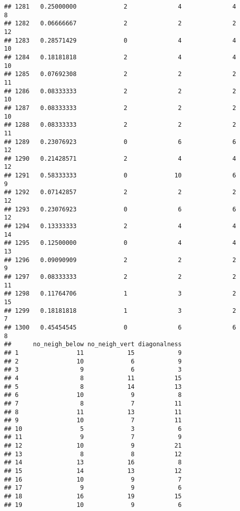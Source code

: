 \documentclass[
]{article}
\begin{document}
\begin{verbatim}
## 1281   0.25000000             2              4              4              8
## 1282   0.06666667             2              2              2             12
## 1283   0.28571429             0              4              4             10
## 1284   0.18181818             2              4              4             10
## 1285   0.07692308             2              2              2             11
## 1286   0.08333333             2              2              2             10
## 1287   0.08333333             2              2              2             10
## 1288   0.08333333             2              2              2             11
## 1289   0.23076923             0              6              6             12
## 1290   0.21428571             2              4              4             12
## 1291   0.58333333             0             10              6              9
## 1292   0.07142857             2              2              2             12
## 1293   0.23076923             0              6              6             12
## 1294   0.13333333             2              4              4             14
## 1295   0.12500000             0              4              4             13
## 1296   0.09090909             2              2              2              9
## 1297   0.08333333             2              2              2             11
## 1298   0.11764706             1              3              2             15
## 1299   0.18181818             1              3              2              7
## 1300   0.45454545             0              6              6              8
##      no_neigh_below no_neigh_vert diagonalness
## 1                11            15            9
## 2                10             6            9
## 3                 9             6            3
## 4                 8            11           15
## 5                 8            14           13
## 6                10             9            8
## 7                 8             7           11
## 8                11            13           11
## 9                10             7           11
## 10                5             3            6
## 11                9             7            9
## 12               10             9           21
## 13                8             8           12
## 14               13            16            8
## 15               14            13           12
## 16               10             9            7
## 17                9             9            6
## 18               16            19           15
## 19               10             9            6

\end{verbatim}
\end{document}
